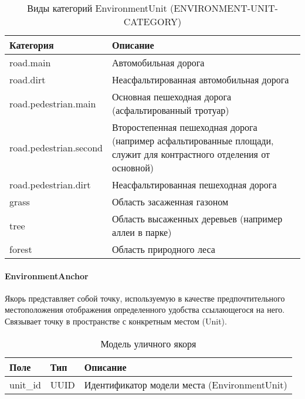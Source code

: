         \begin{center}
          \begin{xltabular}{\linewidth}{|l|X|}
            \caption{Виды категорий EnvironmentUnit (ENVIRONMENT-UNIT-CATEGORY)}\\ \hline
            Категория              & Описание                                                                                                            \\ \hline
            road.main              & Автомобильная дорога                                                                                                \\ \hline
            road.dirt              & Неасфальтированная автомобильная дорога                                                                             \\ \hline
            road.pedestrian.main   & Основная пешеходная дорога (асфальтированный тротуар)                                                               \\ \hline
            road.pedestrian.second & Второстепенная пешеходная дорога (например асфальтированные площади, служит для контрастного отделения от основной) \\ \hline
            road.pedestrian.dirt   & Неасфальтированная  пешеходная дорога                                                                               \\ \hline
            grass                  & Область засаженная газоном                                                                                          \\ \hline
            tree                   & Область высаженных деревьев (например аллеи в парке)                                                                \\ \hline
            forest                 & Область природного леса                                                                                             \\ \hline
          \end{xltabular}
        \end{center}


      \paragraph{EnvironmentAnchor}

        Якорь представляет собой точку, используемую в качестве предпочтительного местоположения отображения определенного удобства ссылающегося на него. Связывает точку в пространстве с конкретным местом (Unit).
        \begin{center}
          \begin{xltabular}{\linewidth}{|l|p{4cm}|X|}
            \caption{Модель уличного якоря}\\\hline
            Поле     & Тип   & Описание                                     \\ \hline
            unit\_id & UUID  & Идентификатор модели места (EnvironmentUnit) \\ \hline
          \end{xltabular}
        \end{center}


